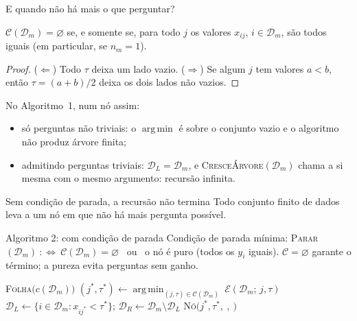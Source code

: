 \documentclass[aspectratio=169]{beamer}
\DeclareMathOperator*{\argmin}{arg\,min}
\newcommand{\Err}{\mathcal E}
\newcommand{\Cand}{\mathcal C}            %
\newcommand{\aGrowZero}{1}
\newcommand{\aGrow}{2}
\begin{document}
\begin{frame}{E quando não há mais o que perguntar?}
\small
\begin{lemma}
$\Cand(\mathcal D_m)=\varnothing$ se, e somente se, para todo $j$ os valores $x_{ij}$, $i\in\mathcal D_m$, são todos iguais (em particular, se $n_m=1$).
\end{lemma}
\begin{proof}
($\Leftarrow$) Todo $\tau$ deixa um lado vazio. ($\Rightarrow$) Se algum $j$ tem valores $a<b$, então $\tau=(a+b)/2$ deixa os dois lados não vazios.
\end{proof}
No Algoritmo~\aGrowZero, num nó assim:
\begin{itemize}
  \item só perguntas não triviais: o $\argmin$ é sobre o conjunto \alert{vazio} e o algoritmo não produz árvore finita;
  \item admitindo perguntas triviais: $\mathcal D_L=\mathcal D_m$, e \textsc{CresceÁrvore}$(\mathcal D_m)$ chama a si mesma com o mesmo argumento: \alert{recursão infinita}.
\end{itemize}
\begin{alertblock}{Sem condição de parada, a recursão não termina}
Todo conjunto finito de dados leva a um nó em que não há mais pergunta possível.
\end{alertblock}
\end{frame}

\begin{frame}[t]{Algoritmo \aGrow: com condição de parada}
\small
Condição de parada mínima: \textsc{Parar}$(\mathcal D_m)\ :\Longleftrightarrow\ \Cand(\mathcal D_m)=\varnothing$ \ ou \ o nó é \alert{puro} (todos os $y_i$ iguais). $\Cand=\varnothing$ \alert{garante} o término; a pureza evita perguntas sem ganho.
\footnotesize
\begin{algorithmic}[1]
   \State \Return \textsc{Folha}$\bigl(c(\mathcal D_m)\bigr)$ \EndIf
  \State $(j^*,\tau^*)\gets\argmin_{(j,\tau)\in\Cand(\mathcal D_m)}\ \Err(\mathcal D_m;\,j,\tau)$
  \State $\mathcal D_L\gets\{i\in\mathcal D_m: x_{ij^*}<\tau^*\}$; \quad $\mathcal D_R\gets\mathcal D_m\setminus\mathcal D_L$
  \State \Return \textsc{Nó}$\bigl(j^*,\tau^*,\ $$,\ $$\bigr)$
\EndFunction
\end{algorithmic}
\end{frame}
\end{document}
